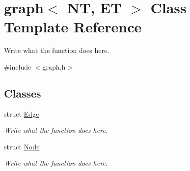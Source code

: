\hypertarget{classgraph}{\section{graph$<$ N\+T, E\+T $>$ Class Template Reference}
\label{classgraph}
}


Write what the function does here.  




{\ttfamily \#include $<$graph.\+h$>$}

\subsection*{Classes}
\begin{DoxyCompactItemize}
\item 
struct \hyperlink{structgraph_1_1Edge}{Edge}
\begin{DoxyCompactList}\small\item\em Write what the function does here. \end{DoxyCompactList}\item 
struct \hyperlink{structgraph_1_1Node}{Node}
\begin{DoxyCompactList}\small\item\em Write what the function does here. \end{DoxyCompactList}\end{DoxyCompactItemize}
